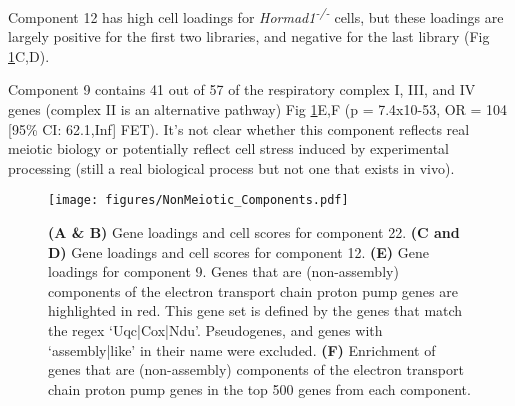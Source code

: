 Component 12 has high cell loadings for \textit{Hormad1\textsuperscript{-/-}} cells, but these loadings are largely positive for the first two libraries, and negative for the last library (Fig \ref{fig:NonMeiotic}C,D).

Component 9 contains 41 out of 57 of the respiratory complex I, III, and IV genes (complex II is an alternative pathway) Fig \ref{fig:NonMeiotic}E,F (p = 7.4x10-53, OR = 104 [95\% CI: 62.1,Inf] FET). It's not clear whether this component reflects real meiotic biology or potentially reflect cell stress induced by experimental processing (still a real biological process but not one that exists in vivo).


\begin{figure}[H]
	\centering
	\texttt{[image: figures/NonMeiotic\_Components.pdf]}
	\caption{
		\textbf{(A \& B)} Gene loadings and cell scores for component 22.
		\textbf{(C and D)} Gene loadings and cell scores for component 12.
		\textbf{(E)} Gene loadings for component 9. Genes that are (non-assembly) components of the electron transport chain proton pump genes are highlighted in red. This gene set is defined by the genes that match the regex ‘Uqc|Cox|Ndu’. Pseudogenes, and genes with ‘assembly|like’ in their name were excluded.
		\textbf{(F)} Enrichment of genes that are (non-assembly) components of the electron transport chain proton pump genes in the top 500 genes from each component.
	}
	\label{fig:NonMeiotic}
\end{figure}


